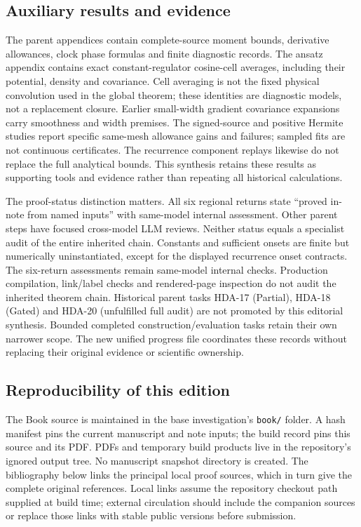 \subsection{Auxiliary results and evidence}
The parent appendices contain complete-source moment bounds, derivative
allowances, clock phase formulas and finite diagnostic records. The
ansatz appendix contains exact constant-regulator cosine-cell averages,
including their potential, density and covariance. Cell averaging is
not the fixed physical convolution used in the global theorem; these
identities are diagnostic models, not a replacement closure. Earlier
small-width gradient covariance expansions carry smoothness and width
premises. The signed-source and positive Hermite studies report specific
same-mesh allowance gains and failures; sampled fits are not continuous
certificates. The recurrence component replays likewise do not replace
the full analytical bounds. This synthesis retains these results as
supporting tools and evidence rather than repeating all historical
calculations.

The proof-status distinction matters. All six regional returns state
``proved in-note from named inputs'' with same-model internal assessment.
Other parent steps have focused cross-model LLM reviews. Neither status
equals a specialist audit of the entire inherited chain. Constants and sufficient onsets are finite but numerically uninstantiated, except for the displayed recurrence onset contracts. The six-return assessments remain same-model internal checks. Production compilation, link/label checks and rendered-page inspection do not audit the inherited theorem chain. Historical
parent tasks HDA-17 (Partial), HDA-18 (Gated) and HDA-20 (unfulfilled
full audit) are not promoted by this editorial synthesis. Bounded
completed construction/evaluation tasks retain their own narrower scope.
The new unified progress file coordinates these records without replacing
their original evidence or scientific ownership.

\subsection{Reproducibility of this edition}
The Book source is maintained in the base investigation's \texttt{book/}
folder. A hash manifest pins the current manuscript and note inputs;
the build record pins this source and its PDF. PDFs and temporary build
products live in the repository's ignored output tree. No manuscript
snapshot directory is created. The bibliography below links the principal
local proof sources, which in turn give the complete original references.
Local links assume the repository checkout path supplied at build time;
external circulation should include the companion sources or replace
those links with stable public versions before submission.

